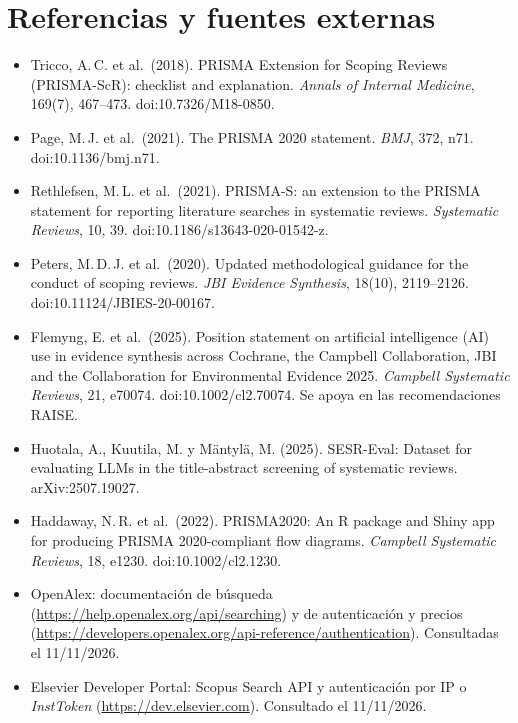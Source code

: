 \documentclass[11pt,a4paper]{article}
\begin{document}
\section{Referencias y fuentes externas}\label{sec:refs}
\small
\begin{itemize}
  \item Tricco, A.\,C. et al.\ (2018). PRISMA Extension for Scoping Reviews (PRISMA-ScR): checklist and explanation. \emph{Annals of Internal Medicine}, 169(7), 467--473. doi:10.7326/M18-0850.
  \item Page, M.\,J. et al.\ (2021). The PRISMA 2020 statement. \emph{BMJ}, 372, n71. doi:10.1136/bmj.n71.
  \item Rethlefsen, M.\,L. et al.\ (2021). PRISMA-S: an extension to the PRISMA statement for reporting literature searches in systematic reviews. \emph{Systematic Reviews}, 10, 39. doi:10.1186/s13643-020-01542-z.
  \item Peters, M.\,D.\,J. et al.\ (2020). Updated methodological guidance for the conduct of scoping reviews. \emph{JBI Evidence Synthesis}, 18(10), 2119--2126. doi:10.11124/JBIES-20-00167.
  \item Flemyng, E. et al.\ (2025). Position statement on artificial intelligence (AI) use in evidence synthesis across Cochrane, the Campbell Collaboration, JBI and the Collaboration for Environmental Evidence 2025. \emph{Campbell Systematic Reviews}, 21, e70074. doi:10.1002/cl2.70074. Se apoya en las recomendaciones RAISE.
  \item Huotala, A., Kuutila, M. y Mäntylä, M. (2025). SESR-Eval: Dataset for evaluating LLMs in the title-abstract screening of systematic reviews. arXiv:2507.19027.
  \item Haddaway, N.\,R. et al.\ (2022). PRISMA2020: An R package and Shiny app for producing PRISMA 2020-compliant flow diagrams. \emph{Campbell Systematic Reviews}, 18, e1230. doi:10.1002/cl2.1230.
  \item OpenAlex: documentación de búsqueda (\url{https://help.openalex.org/api/searching}) y de autenticación y precios (\url{https://developers.openalex.org/api-reference/authentication}). Consultadas el 11/11/2026.
  \item Elsevier Developer Portal: Scopus Search API y autenticación por IP o \emph{InstToken} (\url{https://dev.elsevier.com}). Consultado el 11/11/2026.
\end{itemize}
\end{document}

